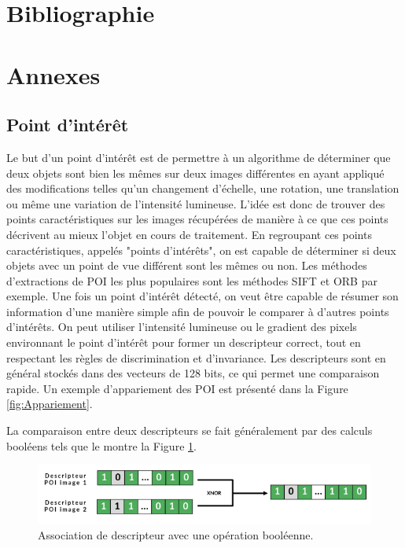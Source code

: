 \documentclass[11pt]{article}
\begin{document}
  \pagebreak
  
  \section{Bibliographie}

    \printbibliography[heading=none]

  \pagebreak
  
  \section{Annexes}

    \subsection{Point d'intérêt}
      Le but d'un point d'intérêt est de permettre à un algorithme de déterminer que deux objets sont bien les mêmes sur deux images 
      différentes en ayant appliqué des modifications telles qu'un changement d'échelle, une rotation, une translation ou même une 
      variation de l'intensité lumineuse.
      L'idée est donc de trouver des points caractéristiques sur les images récupérées de manière à ce que ces points décrivent au mieux 
      l'objet en cours de traitement. En regroupant ces points caractéristiques, appelés "points d'intérêts", on est capable de déterminer 
      si deux objets avec un point de vue différent sont les mêmes ou non. Les méthodes d'extractions de POI les plus populaires 
      sont les méthodes SIFT et ORB par exemple.
      Une fois un point d'intérêt détecté, on veut être capable de résumer son information d'une manière simple afin de pouvoir le comparer
      à d'autres points d'intérêts. On peut utiliser l'intensité lumineuse ou le gradient des pixels environnant le point d'intérêt pour 
      former un descripteur correct, tout en respectant les règles de discrimination et d'invariance. Les descripteurs sont en général 
      stockés dans des vecteurs de 128 bits, ce qui permet une comparaison rapide.
      Un exemple d'appariement des POI est présenté dans la Figure \ref{fig:Appariement}. 

      La comparaison entre deux descripteurs se fait généralement par des calculs booléens tels que le montre la 
      Figure \ref{fig:Descripteur}.
      
      \begin{figure}[hbt]  
        \includegraphics[width=\textwidth]{CalculsDescripteurs.png}    
        \caption{Association de descripteur avec une opération booléenne.}
        \label{fig:Descripteur}
      \end{figure} 
\end{document}
